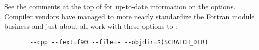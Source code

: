 See the comments at the top of  for up-to-date
information on the options. Compiler vendors have managed to more nearly
standardize the Fortran module business and just about all work with
these options to :
\begin{verbatim}
       --cpp --fext=f90 --file=- --objdir=$(SCRATCH_DIR)
\end{verbatim}

